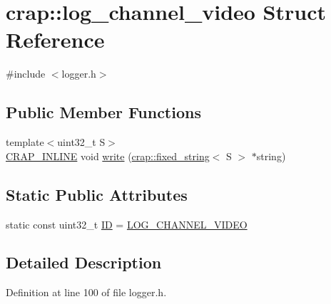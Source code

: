 \hypertarget{structcrap_1_1log__channel__video}{\section{crap\+:\+:log\+\_\+channel\+\_\+video Struct Reference}
\label{structcrap_1_1log__channel__video}
}


{\ttfamily \#include $<$logger.\+h$>$}

\subsection*{Public Member Functions}
\begin{DoxyCompactItemize}
\item 
{\footnotesize template$<$uint32\+\_\+t S$>$ }\\\hyperlink{config__x86_8h_a5a40526b8d842e7ff731509998bb0f1c}{C\+R\+A\+P\+\_\+\+I\+N\+L\+I\+N\+E} void \hyperlink{structcrap_1_1log__channel__video_afd7f3f8cb6ee03908fbcbbc4ce5b9368}{write} (\hyperlink{classcrap_1_1fixed__string}{crap\+::fixed\+\_\+string}$<$ S $>$ $\ast$string)
\end{DoxyCompactItemize}
\subsection*{Static Public Attributes}
\begin{DoxyCompactItemize}
\item 
static const uint32\+\_\+t \hyperlink{structcrap_1_1log__channel__video_ac2a4ca99490b58e4b612084dbcafa122}{I\+D} = \hyperlink{logger_8h_a6dc128b9cc34ce68ba48b4a78f0e2407}{L\+O\+G\+\_\+\+C\+H\+A\+N\+N\+E\+L\+\_\+\+V\+I\+D\+E\+O}
\end{DoxyCompactItemize}


\subsection{Detailed Description}


Definition at line 100 of file logger.\+h.



